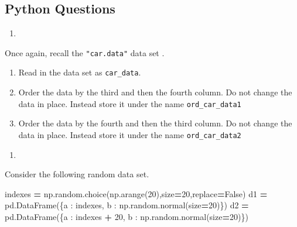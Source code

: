 \documentclass[
  12pt,
  krantz2]{krantz}
\makeatletter
\newenvironment{Shaded}{\begin{snugshade}}{\end{snugshade}}
\newcommand{\DecValTok}[1]{\textcolor[rgb]{0.06,0.06,0.06}{#1}}
\newcommand{\NormalTok}[1]{#1}
\newcommand{\OperatorTok}[1]{\textcolor[rgb]{0.43,0.43,0.43}{\textbf{#1}}}
\newcommand{\StringTok}[1]{\textcolor[rgb]{0.5,0.5,0.5}{#1}}
\newcommand{\VariableTok}[1]{\textcolor[rgb]{0,0,0}{#1}}
\providecommand{\tightlist}{%
  \setlength{\itemsep}{0pt}\setlength{\parskip}{0pt}}
\newenvironment{kframe}{%
\medskip{}
\setlength{\fboxsep}{.8em}
 \def\at@end@of@kframe{}%
 \ifinner\ifhmode%
  \def\at@end@of@kframe{\end{minipage}}%
  \begin{minipage}{\columnwidth}%
 \fi\fi%
 \def\FrameCommand##1{\hskip\@totalleftmargin \hskip-\fboxsep
 \colorbox{shadecolor}{##1}\hskip-\fboxsep
     \hskip-\linewidth \hskip-\@totalleftmargin \hskip\columnwidth}%
 \MakeFramed {\advance\hsize-\width
   \@totalleftmargin\z@ \linewidth\hsize
   \@setminipage}}%
 {\par\unskip\endMakeFramed%
 \at@end@of@kframe}
\renewenvironment{Shaded}{\begin{kframe}}{\end{kframe}}
\makeatother
\begin{document}
\hypertarget{python-questions-9}{%
\subsection{Python Questions}\label{python-questions-9}}

\begin{enumerate}
\def\labelenumi{\arabic{enumi}.}
\tightlist
\item
\end{enumerate}

Once again, recall the \texttt{"car.data"} data set \citep{misc_car_evaluation_19}.

\begin{enumerate}
\def\labelenumi{\alph{enumi})}
\tightlist
\item
  Read in the data set as \texttt{car\_data}.
\item
  Order the data by the third and then the fourth column. Do not change the data in place. Instead store it under the name \texttt{ord\_car\_data1}
\item
  Order the data by the fourth and then the third column. Do not change the data in place. Instead store it under the name \texttt{ord\_car\_data2}
\end{enumerate}

\begin{enumerate}
\def\labelenumi{\arabic{enumi}.}
\setcounter{enumi}{1}
\tightlist
\item
\end{enumerate}

Consider the following random data set.

\begin{Shaded}
\begin{Highlighting}[]
\NormalTok{indexes  }\OperatorTok{=}\NormalTok{ np.random.choice(np.arange(}\DecValTok{20}\NormalTok{),size}\OperatorTok{=}\DecValTok{20}\NormalTok{,replace}\OperatorTok{=}\VariableTok{False}\NormalTok{)}
\NormalTok{d1 }\OperatorTok{=}\NormalTok{ pd.DataFrame(\{}\StringTok{\textquotesingle{}a\textquotesingle{}}\NormalTok{ : indexes, }
                   \StringTok{\textquotesingle{}b\textquotesingle{}}\NormalTok{ : np.random.normal(size}\OperatorTok{=}\DecValTok{20}\NormalTok{)\})}
\NormalTok{d2 }\OperatorTok{=}\NormalTok{ pd.DataFrame(\{}\StringTok{\textquotesingle{}a\textquotesingle{}}\NormalTok{ : indexes }\OperatorTok{+} \DecValTok{20}\NormalTok{, }
                   \StringTok{\textquotesingle{}b\textquotesingle{}}\NormalTok{ : np.random.normal(size}\OperatorTok{=}\DecValTok{20}\NormalTok{)\})}
\end{Highlighting}
\end{Shaded}
\end{document}
